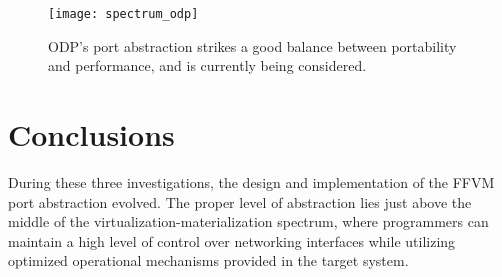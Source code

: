\begin{figure}[h!]
  \centering
  \texttt{[image: spectrum\_odp]}
  \caption{ODP's port abstraction strikes a good balance between portability
  and performance, and is currently being considered.}
  \label{hardware:spectrum_odp}
\end{figure}

\section{Conclusions}
\label{hardware:concl}
During these three investigations, the design and implementation of the FFVM
port abstraction evolved. The proper level of abstraction lies just above the
middle of the virtualization-materialization spectrum, where programmers can
maintain a high level of control over networking interfaces while utilizing
optimized operational mechanisms provided in the target system.


